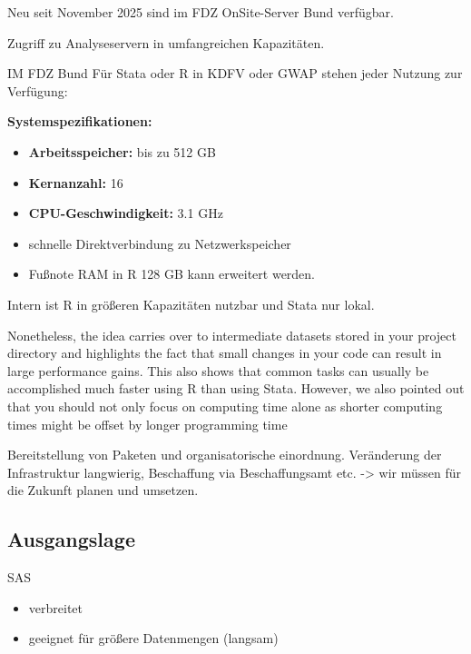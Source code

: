 \documentclass[
  german,
  10pt,
  twoside]{article}
\providecommand{\tightlist}{%
  \setlength{\itemsep}{0pt}\setlength{\parskip}{0pt}}
\begin{document}
Neu seit November 2025 sind im FDZ OnSite-Server Bund verfügbar.

Zugriff zu Analyseservern in umfangreichen Kapazitäten.

IM FDZ Bund Für Stata oder R in KDFV oder GWAP stehen jeder Nutzung zur
Verfügung:

\textbf{Systemspezifikationen:}

\begin{itemize}
\tightlist
\item
  \textbf{Arbeitsspeicher:} bis zu 512 GB
\item
  \textbf{Kernanzahl:} 16\\
\item
  \textbf{CPU-Geschwindigkeit:} 3.1 GHz
\end{itemize}

\begin{itemize}
\tightlist
\item
  schnelle Direktverbindung zu Netzwerkspeicher
\item
  Fußnote RAM in R 128 GB kann erweitert werden.
\end{itemize}

Intern ist R in größeren Kapazitäten nutzbar und Stata nur lokal.

Nonetheless, the idea carries over to intermediate datasets stored in
your project directory and highlights the fact that small changes in
your code can result in large performance gains. This also shows that
common tasks can usually be accomplished much faster using R than using
Stata. However, we also pointed out that you should not only focus on
computing time alone as shorter computing times might be offset by
longer programming time

Bereitstellung von Paketen und organisatorische einordnung. Veränderung
der Infrastruktur langwierig, Beschaffung via Beschaffungsamt etc.
-\textgreater{} wir müssen für die Zukunft planen und umsetzen.

\subsection{Ausgangslage}\label{ausgangslage}

SAS

\begin{itemize}
\tightlist
\item
  verbreitet
\item
  geeignet für größere Datenmengen (langsam)
\end{itemize}
\end{document}
